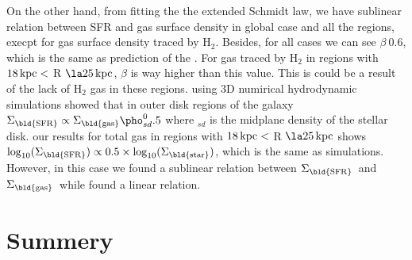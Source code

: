 \documentclass[useAMS,usenatbib]{mn2e}
\newcommand \kpc        {\,{\rm kpc}}
\newcommand \sigmagas    {$\Sigma_{\rm \bld {gas }}$\ }
\newcommand \eqsigmagas    {\Sigma_{\rm \bld {gas }}}
\newcommand \sigmasfr     {$\Sigma_{\rm \bld {SFR }}$\ }
\newcommand \eqsigmasfr     {\Sigma_{\rm \bld {SFR }}}
\newcommand \eqsigmastar    {\Sigma_{\rm \bld {star }}}
\begin{document}
On the other hand, from fitting the the extended Schmidt law, we have sublinear relation between SFR and gas surface density in global case and all the regions, execpt for gas surface density traced by H$_2$. Besides, for all cases we can see $\beta ~ 0.6$, which is the same as prediction of the \cite{Shi11}. For gas traced by H$_2$ in regions with $18\kpc <$ R $\la 25\kpc$, $\beta$ is way higher than this value. This is could be a result of the lack of H$_2$ gas in these regions. \cite{Kim13} using 3D numirical hydrodynamic simulations showed that in outer disk regions of the galaxy $\eqsigmasfr \propto \eqsigmagas \pho_{sd}^0.5$ where \pho$_{sd}$ is the midplane density of the stellar disk. our results for total gas in regions with $18\kpc <$ R $\la 25\kpc$ shows $\log_{10}(\eqsigmasfr) \propto 0.5 \times \log_{10}(\eqsigmastar)$, which is the same as simulations. However, in this case we found a sublinear relation between \sigmasfr and \sigmagas while \cite{Kim13} found a linear relation. 
\section{Summery}

\end{document}
